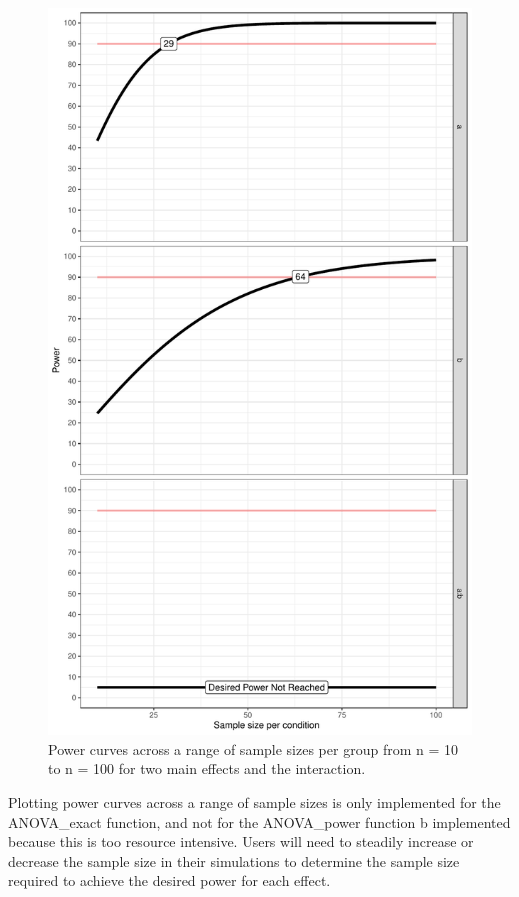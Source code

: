 \documentclass[
  english,
  ,jou,floatsintext]{apa6}
\begin{document}
\begin{figure}
\centering
\includegraphics{0.1_Simulation_Based_Power_Analysis_For_Factorial_ANOVA_Designs_files/figure-latex/power-plot-1.pdf}
\caption{\label{fig:power-plot}Power curves across a range of sample sizes per group from n = 10 to n = 100 for two main effects and the interaction.}
\end{figure}

Plotting power curves across a range of sample sizes is only implemented for the ANOVA\_exact function, and not for the ANOVA\_power function b implemented because this is too resource intensive.
Users will need to steadily increase or decrease the sample size in their simulations to determine the sample size required to achieve the desired power for each effect.
\end{document}
